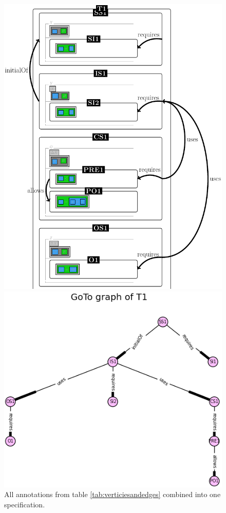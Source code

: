 \begin{figure}[H]
\centering
\begin{minipage}{0.35\textwidth}
\centering
\includegraphics[scale=0.18]{Figures/Formalising/draspec.png}
\caption{All annotations from table \ref{tab:verticiesandedges} combined into one specification.  \label{fig:draspeca}}
\end{minipage}\hfill
\begin{minipage}{0.6\textwidth}
\centering
\includegraphics[scale=0.5]{Figures/Formalising/goto_text.png}

\end{minipage}
\end{figure}
